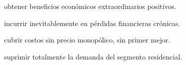 \begin{opts}
    \item obtener beneficios económicos extraordinarios positivos.
    \item incurrir inevitablemente en pérdidas financieras crónicas.
    \item cubrir costos sin precio monopólico, sin primer mejor.
    \item suprimir totalmente la demanda del segmento residencial.
\end{opts}
